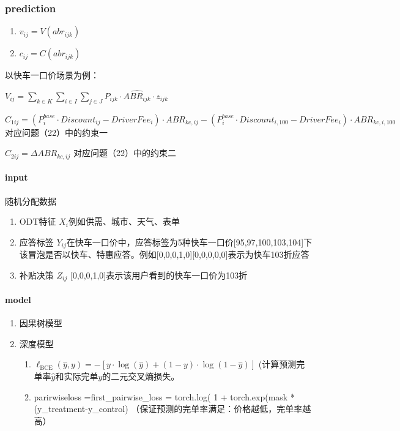 \documentclass[12pt, a4paper]{article}
\begin{document}
\subsubsection{prediction}




\begin{enumerate}
    \item $v_{ij}=V({abr}_{ijk})$
    \item $c_{ij}=C({abr}_{ijk})$
\end{enumerate}
以快车一口价场景为例：\par
$V_{ij}=\sum_{k \in K}\sum_{i \in I}\sum_{j \in J} P_{ijk} \cdot \hat{ABR_{ijk}} \cdot z_{ijk}$\par
$C_{1ij}=(P^{base}_i \cdot Discount_{ij}-DriverFee_i) \cdot ABR_{kc,ij} -  (P^{base}_i \cdot Discount_{i,100} - DriverFee_i) \cdot ABR_{kc,i,100}$对应问题（22）中的约束一\par
$C_{2ij}=\Delta ABR_{kc,ij}$ 对应问题（22）中的约束二



\paragraph{input}
随机分配数据
\begin{enumerate}
    \item ODT特征 $X_{i}$例如供需、城市、天气、表单
    \item 应答标签 $Y_{ij}$在快车一口价中，应答标签为5种快车一口价[95,97,100,103,104]下该冒泡是否以快车、特惠应答。例如[0,0,0,1,0][0,0,0,0,0]表示为快车103折应答
    \item 补贴决策 $Z_{ij}$
    [0,0,0,1,0]表示该用户看到的快车一口价为103折

\end{enumerate}


\paragraph{model}
\begin{enumerate}
    \item 因果树模型

    \item 深度模型     
    \begin{enumerate}
        \item $\ell_{\text {BCE}}(\hat y,y)= -[y \cdot \log(\hat y) + (1-y)\cdot \log(1-\hat y)]$ (计算预测完单率$\hat{y}$和实际完单$y$的二元交叉熵损失。
        \item parirwiseloss =first\_pairwise\_loss = torch.log(
                1 + torch.exp(mask * (y\_treatment-y\_control)
                （保证预测的完单率满足：价格越低，完单率越高）
    \end{enumerate}
\end{enumerate}
\end{document}
